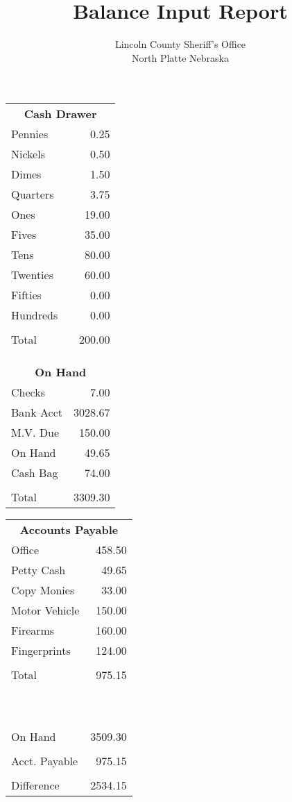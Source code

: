 \documentclass[12pt,letterpaper]{article}
\title{Balance Input Report}
\author{Lincoln County Sheriff's Office \\ North Platte Nebraska}
\begin{document}
\maketitle

\begin{multicols}{2}
\begin{tabular}{lr}
\multicolumn{2}{c}{\textbf{Cash Drawer}} \\
Pennies & 0.25 \\
Nickels & 0.50 \\
Dimes & 1.50 \\
Quarters & 3.75 \\
Ones & 19.00 \\
Fives & 35.00 \\
Tens & 80.00 \\
Twenties & 60.00 \\
Fifties & 0.00 \\
Hundreds & 0.00 \\
 & \\
\hline
Total & 200.00 \\
 & \\
 & \\
 & \\
\multicolumn{2}{c}{\textbf{On Hand}} \\
Checks & 7.00 \\
Bank Acct & 3028.67 \\
M.V. Due & 150.00 \\
On Hand & 49.65 \\
Cash Bag & 74.00 \\
 & \\
\hline
Total & 3309.30 \\
\end{tabular}

\begin{tabular}{lr}
\multicolumn{2}{c}{\textbf{Accounts Payable}} \\
Office & 458.50\\
Petty Cash & 49.65\\
Copy Monies & 33.00\\
Motor Vehicle & 150.00\\
Firearms & 160.00 \\
Fingerprints & 124.00 \\
 & \\
\hline
Total & 975.15 \\
 & \\
 & \\
 & \\
 & \\
 & \\
 & \\
 & \\
 & \\
 & \\
 & \\
On Hand & 3509.30 \\
 & \\
Acct. Payable & 975.15 \\
 & \\
\hline
Difference & 2534.15 \\
\end{tabular}
\end{multicols}
\end{document}
